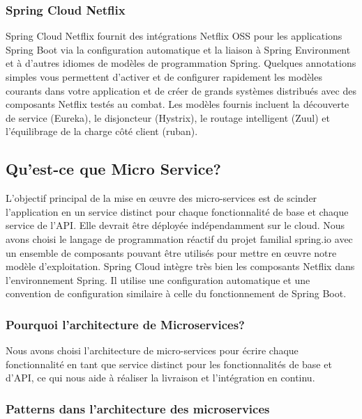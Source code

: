  
  \subsubsection{Spring Cloud Netflix}
 Spring Cloud Netflix fournit des intégrations Netflix OSS pour les applications Spring Boot via la configuration automatique et la liaison à Spring Environment et à d'autres idiomes de modèles de programmation Spring. Quelques annotations simples vous permettent d'activer et de configurer rapidement les modèles courants dans votre application et de créer de grands systèmes distribués avec des composants Netflix testés au combat. Les modèles fournis incluent la découverte de service (Eureka), le disjoncteur (Hystrix), le routage intelligent (Zuul) et l’équilibrage de la charge côté client (ruban).
 
 \subsection{ Qu'est-ce que Micro Service?}

 L'objectif principal de la mise en œuvre des micro-services est de scinder l'application en un service distinct pour chaque fonctionnalité de base et chaque service de l'API. Elle devrait être déployée indépendamment sur le cloud. Nous avons choisi le langage de programmation réactif du projet familial spring.io avec un ensemble de composants pouvant être utilisés pour mettre en œuvre notre modèle d'exploitation. Spring Cloud intègre très bien les composants Netflix dans l’environnement Spring. Il utilise une configuration automatique et une convention de configuration similaire à celle du fonctionnement de Spring Boot.


\subsubsection{Pourquoi l’architecture de Microservices?}

Nous avons choisi l'architecture de micro-services pour écrire chaque fonctionnalité en tant que service distinct pour les fonctionnalités de base et d'API, ce qui nous aide à réaliser la livraison et l'intégration en continu.

\subsubsection{Patterns dans l'architecture des microservices}



